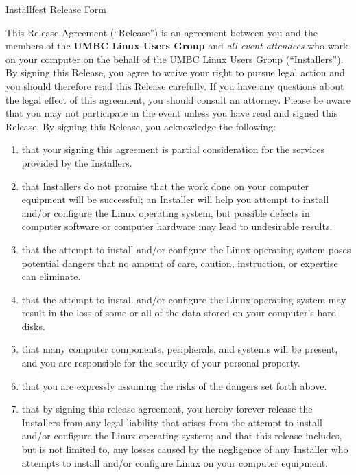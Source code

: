 \documentclass[11pt,draft]{article}
\def\TheRelease{Release}
\def\TheInstallers{Installers}
\def\AnInstaller{Installer}
\begin{document}
\begin{center} \LARGE
    Installfest Release Form
\end{center}

\vspace{1em}

This Release Agreement (``\TheRelease'') is an agreement between you and
the members of the \textbf{UMBC Linux Users Group} and \emph{all event
attendees} who work on your computer on the behalf of the UMBC Linux
Users Group (``\TheInstallers''). By signing this Release, you agree to
waive your right to pursue legal action and you should therefore read
this \TheRelease{} carefully. If you have any questions about the legal
effect of this agreement, you should consult an attorney. Please be
aware that you may not participate in the event unless you have read and
signed this \TheRelease. By signing this \TheRelease{}, you acknowledge
the following:

\begin{enumerate}
\item that your signing this agreement is partial consideration for the
    services provided by the \TheInstallers{}.

\item that \TheInstallers{} do not promise that the work done on your
    computer equipment will be successful; an \AnInstaller{} will help
    you attempt to install and/or configure the Linux operating system,
    but possible defects in computer software or computer hardware may
    lead to undesirable results.

\item that the attempt to install and/or configure the Linux operating
    system poses potential dangers that no amount of care, caution,
    instruction, or expertise can eliminate.

\item that the attempt to install and/or configure the Linux operating
    system may result in the loss of some or all of the data stored on
    your computer's hard disks.

\item that many computer components, peripherals, and systems will be
    present, and you are responsible for the security of your personal
    property.

\item that you are expressly assuming the risks of the dangers set forth
    above.

\item that by signing this release agreement, you hereby forever release
    the \TheInstallers{} from any legal liability that arises from the
    attempt to install and/or configure the Linux operating system; and
    that this release includes, but is not limited to, any losses caused
    by the negligence of any \AnInstaller{} who attempts to install
    and/or configure Linux on your computer equipment.

\end{enumerate}
\end{document}
